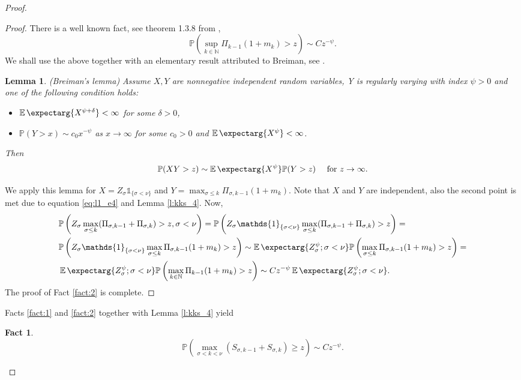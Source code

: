 \documentclass[12pt]{article}
\newcommand{\Pro}{\mathbb{P}}
\newcommand*\Proo[1]{\Pro \left( #1 \right) }
\newtheorem{lemma}[theorem]{Lemma}
\newtheorem{fact}[theorem]{Fact}
\newcommand{\expect}{\operatorname{\mathbb{E}}\expectarg}
\begin{document}
\begin{proof}
\begin{proof}
There is a well known fact, see theorem 1.3.8 from \cite{IKSANOV}, 
\begin{equation}\label{eq:l1_e4}
    \Proo{\sup_{k\in \mathbb{N}} \Pi_{k-1}(1+m_{k}) > z} \sim Cz^{-\psi}. 
\end{equation}
We shall use the above together with an elementary result attributed to Breiman, see \cite{BRIEMAN}. 
\begin{lemma}\label{l:breiman}
(Breiman's lemma) Assume $X, Y$ are nonnegative independent random variables, Y is regularly varying with index $\psi > 0 $ and one of the following condition holds:
\begin{itemize}
    \item $\expect{X^{\psi+\delta}} < \infty$ for some $\delta > 0$, 
    \item $\Pro(Y > x) \sim c_0 x^{-\psi} $ as $x \rightarrow \infty$ for some $c_0 > 0$ and $\expect{X^\psi} < \infty$.
\end{itemize}
Then 
\begin{equation*}
    \Pro(XY > z) \sim \expect{X^\psi} \Pro(Y > z) \quad \text{ for  } z \rightarrow \infty.
\end{equation*}
\end{lemma}
We apply this lemma for $X = Z_\sigma \mathds{1}_{\{ \sigma < \nu \}} $ and $Y = \max_{\sigma \leq k}\Pi_{\sigma, k-1}(1 + m_{k})$. Note that $X$ and $Y$ are independent, also the second point is met due to equation \eqref{eq:l1_e4} and Lemma \ref{l:kks_4}. Now,
\begin{equation*}
\begin{aligned}
    &\Proo{ Z_\sigma \max_{\sigma \leq k}(\Pi_{\sigma, k-1} + \Pi_{\sigma,k}) >  z, \sigma < \nu } = 
    \Proo{ Z_\sigma \mathds{1}_{\{ \sigma < \nu \}} \max_{\sigma \leq k}(\Pi_{\sigma, k-1} + \Pi_{\sigma,k}) >  z} = \\
    &\Proo{ Z_\sigma \mathds{1}_{\{ \sigma < \nu \}} \max_{\sigma \leq k}\Pi_{\sigma, k-1}(1 + m_{k}) >  z } \sim  
    \expect{ Z_\sigma^\psi ; \sigma < \nu } \Proo{ \max_{\sigma \leq k}\Pi_{\sigma, k-1}(1 + m_{k}) >  z } = \\
    &\expect{ Z_\sigma^\psi ; \sigma < \nu } \Proo{ \max_{k\in \mathbb{N}}\Pi_{k-1}(1 + m_{k}) >  z } \sim C z^{-\psi} \expect{ Z_\sigma^\psi ; \sigma < \nu }.
\end{aligned}
\end{equation*}
The proof of Fact \ref{fact:2} is complete.
\end{proof}
Facts \ref{fact:1} and \ref{fact:2} together with Lemma \ref{l:kks_4} yield
\begin{fact}\label{fact:3}
\begin{equation}
    \Proo{\max_{\sigma < k < \nu} (S_{\sigma, k-1} + S_{\sigma, k}) \geq z } \sim Cz^{-\psi}.
\end{equation}
\end{fact}


\end{proof}
\end{document}
